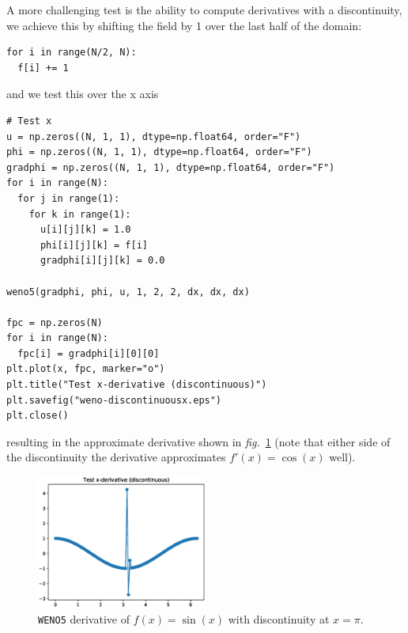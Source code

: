 \documentclass[11pt]{article}
\begin{document}
\pagebreak

A more challenging test is the ability to compute derivatives with a discontinuity, we achieve this
by shifting the field by 1 over the last half of the domain:
\begin{lstlisting}
for i in range(N/2, N):
  f[i] += 1
\end{lstlisting}
and we test this over the x axis
\begin{lstlisting}
# Test x
u = np.zeros((N, 1, 1), dtype=np.float64, order="F")
phi = np.zeros((N, 1, 1), dtype=np.float64, order="F")
gradphi = np.zeros((N, 1, 1), dtype=np.float64, order="F")
for i in range(N):
  for j in range(1):
    for k in range(1):
      u[i][j][k] = 1.0
      phi[i][j][k] = f[i]
      gradphi[i][j][k] = 0.0

weno5(gradphi, phi, u, 1, 2, 2, dx, dx, dx)

fpc = np.zeros(N)
for i in range(N):
  fpc[i] = gradphi[i][0][0]
plt.plot(x, fpc, marker="o")
plt.title("Test x-derivative (discontinuous)")
plt.savefig("weno-discontinuousx.eps")
plt.close()
\end{lstlisting}
resulting in the approximate derivative shown in \emph{fig.}~\ref{fig:org9d0a42c} (note that either
side of the discontinuity the derivative approximates \(f'\left(x\right)=\cos\left(x\right)\) well).

\begin{figure}[htbp]
\centering
\includegraphics[width=0.5\textwidth]{./weno-discontinuousx.eps}
\caption{\label{fig:org9d0a42c}
\texttt{WENO5} derivative of \(f\left(x\right)=\sin\left(x\right)\) with discontinuity at \(x=\pi\).}
\end{figure}
\end{document}
